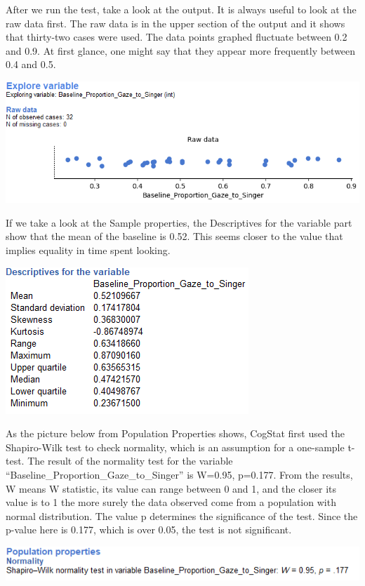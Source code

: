\documentclass[
]{book}
\begin{document}
After we run the test, take a look at the output. It is always useful to look at the raw data first. The raw data is in the upper section of the output and it shows that thirty-two cases were used. The data points graphed fluctuate between 0.2 and 0.9. At first glance, one might say that they appear more frequently between 0.4 and 0.5.

\includegraphics{img/ch6/6.4expvarraw.png}

If we take a look at the Sample properties, the Descriptives for the variable part show that the mean of the baseline is 0.52. This seems closer to the value that implies equality in time spent looking.

\includegraphics{img/ch6/6.4descr.png}

As the picture below from Population Properties shows, CogStat first used the Shapiro-Wilk test to check normality, which is an assumption for a one-sample t-test. The result of the normality test for the variable ``Baseline\_Proportion\_Gaze\_to\_Singer'' is W=0.95, p=0.177. From the results, W means W statistic, its value can range between 0 and 1, and the closer its value is to 1 the more surely the data observed come from a population with normal distribution. The value p determines the significance of the test. Since the p-value here is 0.177, which is over 0.05, the test is not significant.

\includegraphics{img/ch6/6.4poppropSW.png}
\end{document}
